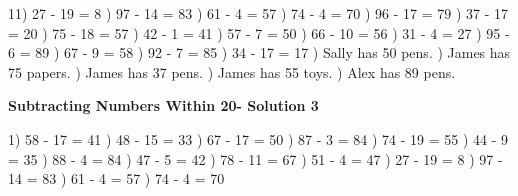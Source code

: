 \documentclass{article}%
\begin{document}
11) 27 {-} 19 = 8%
) 97 {-} 14 = 83%
) 61 {-} 4 = 57%
) 74 {-} 4 = 70%
) 96 {-} 17 = 79%
) 37 {-} 17 = 20%
) 75 {-} 18 = 57%
) 42 {-} 1 = 41%
) 57 {-} 7 = 50%
) 66 {-} 10 = 56%
) 31 {-} 4 = 27%
) 95 {-} 6 = 89%
) 67 {-} 9 = 58%
) 92 {-} 7 = 85%
) 34 {-} 17 = 17%
) Sally has 50 pens.%
) James has 75 papers.%
) James has 37 pens.%
) James has 55 toys.%
) Alex has 89 pens.%
\newline%
\newpage%
\large%
\begin{center}%
\textbf{Subtracting Numbers Within 20- Solution 3}%
\newline%
\end{center} \normalsize%
1) 58 {-} 17 = 41%
) 48 {-} 15 = 33%
) 67 {-} 17 = 50%
) 87 {-} 3 = 84%
) 74 {-} 19 = 55%
) 44 {-} 9 = 35%
) 88 {-} 4 = 84%
) 47 {-} 5 = 42%
) 78 {-} 11 = 67%
) 51 {-} 4 = 47%
) 27 {-} 19 = 8%
) 97 {-} 14 = 83%
) 61 {-} 4 = 57%
) 74 {-} 4 = 70%
\newline%
\end{document}
